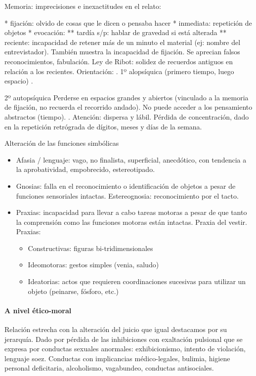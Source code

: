 Memoria: imprecisiones e inexactitudes en el relato:

* fijación: olvido de cosas que le dicen o pensaba hacer
* inmediata: repetición de objetos
* evocación:
** tardía s/p: hablar de gravedad si está alterada
** reciente: incapacidad de retener más de un minuto el material (ej: nombre del entrevistador). También muestra la incapacidad de fijación. Se aprecian falsos reconocimientos, fabulación. Ley de Ribot: solidez de recuerdos antiguos en relación a los recientes. Orientación: . 1º alopsíquica (primero tiempo, luego espacio) .

2º autopsíquica Perderse en espacios grandes y abiertos (vinculado a la memoria de fijación, no recuerda el recorrido andado). No puede acceder a los pensamiento abstractos (tiempo). . Atención: dispersa y lábil. Pérdida de concentración, dado en la repetición retrógrada de dígitos, meses y días de la semana.

Alteración de las funciones simbólicas
\begin{itemize}
	\item Afasia / lenguaje: vago, no finalista, superficial, anecdótico, con tendencia a la aprobatividad, empobrecido, estereotipado.
	\item Gnosias: falla en el reconocimiento o identificación de objetos a pesar de funciones sensoriales intactas. Estereognosia: reconocimiento por el tacto.
	\item Praxias: incapacidad para llevar a cabo tareas motoras a pesar de que tanto la comprensión como las funciones motoras están intactas. Praxia del vestir. Praxias:
	\begin{itemize}
		\item Constructivas: figuras bi-tridimensionales
		\item Ideomotoras: gestos simples (venia, saludo)
		\item Ideatorias: actos que requieren coordinaciones sucesivas para utilizar un objeto (peinarse, fósforo, etc.)
	\end{itemize}
\end{itemize}
\paragraph{A nivel ético-moral}
Relación estrecha con la alteración del juicio que igual destacamos por su jerarquía. Dado por pérdida de las inhibiciones con exaltación pulsional que se expresa por conductas sexuales anormales: exhibicionismo, intento de violación, lenguaje soez. Conductas con implicancias médico-legales, bulimia, higiene personal deficitaria, alcoholismo, vagabundeo, conductas antisociales.
